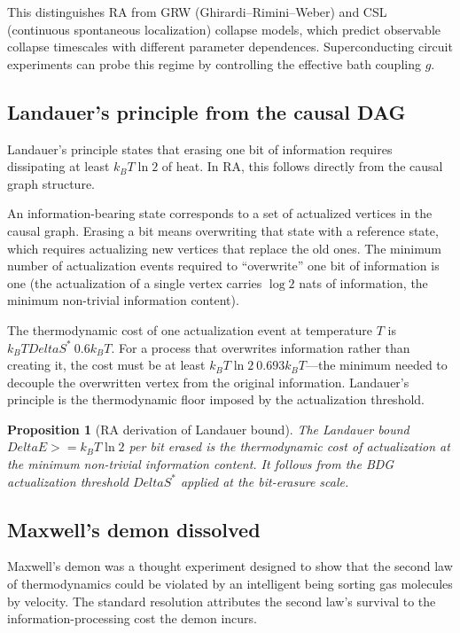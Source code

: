 \documentclass[11pt]{article}
\def\Delta{Delta}%
\def\geq{>=}%
\def\approx{~}%
\newtheorem{proposition}{Proposition}
\begin{document}
This distinguishes RA from GRW (Ghirardi--Rimini--Weber) and CSL (continuous spontaneous localization) collapse models, which predict observable collapse timescales with different parameter dependences. Superconducting circuit experiments can probe this regime by controlling the effective bath coupling $g$.

\subsection{Landauer's principle from the causal DAG}
\label{sec:landauer}

Landauer's principle states that erasing one bit of information requires dissipating at least $k_B T \ln 2$ of heat. In RA, this follows directly from the causal graph structure.

An information-bearing state corresponds to a set of actualized vertices in the causal graph. Erasing a bit means overwriting that state with a reference state, which requires actualizing new vertices that replace the old ones. The minimum number of actualization events required to ``overwrite'' one bit of information is one (the actualization of a single vertex carries $\log 2$ nats of information, the minimum non-trivial information content).

The thermodynamic cost of one actualization event at temperature $T$ is $k_B T \Delta S^* \approx 0.6 k_B T$. For a process that overwrites information rather than creating it, the cost must be at least $k_B T \ln 2 \approx 0.693 k_B T$---the minimum needed to decouple the overwritten vertex from the original information. Landauer's principle is the thermodynamic floor imposed by the actualization threshold.

\begin{proposition}[RA derivation of Landauer bound]
\label{prop:landauer}
The Landauer bound $\Delta E \geq k_B T \ln 2$ per bit erased is the thermodynamic cost of actualization at the minimum non-trivial information content. It follows from the BDG actualization threshold $\Delta S^*$ applied at the bit-erasure scale.
\end{proposition}

\subsection{Maxwell's demon dissolved}
\label{sec:maxwell}

Maxwell's demon was a thought experiment designed to show that the second law of thermodynamics could be violated by an intelligent being sorting gas molecules by velocity. The standard resolution attributes the second law's survival to the information-processing cost the demon incurs.
\end{document}

